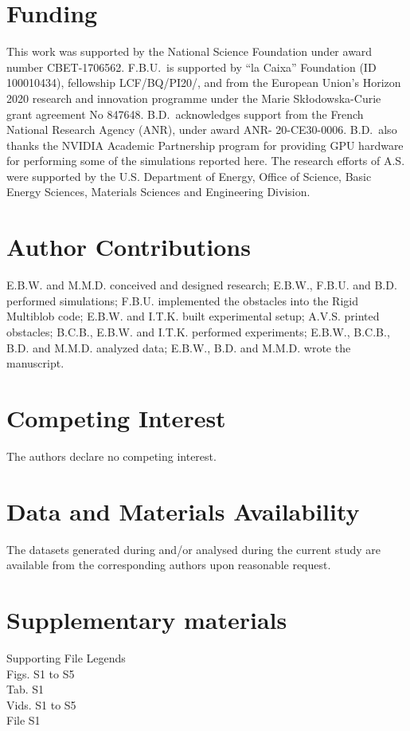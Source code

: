 \documentclass[12pt]{article}
\begin{document}
\section*{Funding}
This work was supported by the National Science Foundation under award number CBET-1706562. F.B.U.\ is supported by “la Caixa” Foundation (ID 100010434), fellowship LCF/\-BQ/\-PI20/, and from the European Union’s Horizon 2020 research and innovation programme under the Marie Skłodowska-Curie grant agreement No 847648. 
B.D.\ acknowledges support from the French National Research Agency (ANR), under award ANR- 20-CE30-0006. B.D.\ also thanks the NVIDIA Academic Partnership program for providing GPU hardware for performing some of the simulations reported here. The research efforts of A.S. were supported by the U.S. Department of Energy, Office of Science, Basic Energy Sciences, Materials Sciences and Engineering Division.

\section*{Author Contributions}
E.B.W. and M.M.D. conceived and designed research; 
E.B.W., F.B.U. and B.D. performed simulations;
F.B.U. implemented the obstacles into the Rigid Multiblob code;
E.B.W. and I.T.K. built experimental setup;
A.V.S. printed obstacles;
B.C.B., E.B.W. and I.T.K. performed experiments;
E.B.W., B.C.B., B.D. and M.M.D. analyzed data;
E.B.W., B.D. and M.M.D. wrote the manuscript.

\section*{Competing Interest}
The authors declare no competing interest.
\section*{Data and Materials Availability}
The datasets generated during and/or analysed during the current study are available from the corresponding authors upon reasonable request.
\section*{Supplementary materials}
Supporting File Legends\\
Figs. S1 to S5\\
Tab. S1\\
Vids. S1 to S5\\
File S1\\
\end{document}
